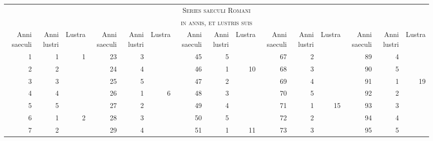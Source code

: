 %
\begin{tabnums} %
\normalsize
\centering
\setlength{\tabcolsep}{2.0pt}
\renewcommand{\arraystretch}{1.0212} %
\newcommand{\hts}{\tiny}
\newcommand{\cwd}{3em}
%
\newcommand{\da}{\scriptsize{†}}
\newcommand{\hdrA}{%
  \hts{\parbox[b]{\cwd}{\raggedright Anni saeculi}} &
  \hts{\parbox[b]{\cwd}{\raggedright Anni lustri}} &
  \hts{\parbox[b]{\cwd}{\raggedright Lustra}}
}
\begin{tabular}{@{} *{15}{r} @{}}
\toprule
\multicolumn{15}{c}{\Large\textsc{Series saeculi Romani}} \\
\multicolumn{15}{c}{\large\textsc{in annis, et lustris suis}} \\
\toprule
 \hdrA & \hdrA & \hdrA & \hdrA & \hdrA
\\
\cmidrule(r){1-3} \cmidrule(r){4-6} \cmidrule(r){7-9}
 \cmidrule(r){10-12} \cmidrule{13-15}
  1 & 1 & 1 & 23 & 3 & ~ & 45 & 5 &  ~ & 67 & 2 & ~ &  89 & 4 &  ~ \\
                           \cline{7-9}
  2 & 2 & ~ & 24 & 4 & ~ & 46 & 1 & 10 & 68 & 3 & ~ &  90 & 5 &  ~ \\
                                                       \cline{13-15}
  3 & 3 & ~ & 25 & 5 & ~ & 47 & 2 &  ~ & 69 & 4 & ~ &  91 & 1 & 19 \\
              \cline{4-6}
  4 & 4 & ~ & 26 & 1 & 6 & 48 & 3 &  ~ & 70 & 5 & ~ &  92 & 2 &  ~ \\
                                         \cline{10-12}
  5 & 5 & ~ & 27 & 2 & ~ & 49 & 4 &  ~ & 71 & 1 & 15 & 93 & 3 &  ~ \\
  \cline{1-3}
  6 & 1 & 2 & 28 & 3 & ~ & 50 & 5 &  ~ & 72 & 2 &  ~ &  94 & 4 &  ~ \\
                           \cline{7-9}
  7 & 2 & ~ & 29 & 4 & ~ & 51 & 1 & 11 & 73 & 3 &  ~ &  95 & 5 &  ~ \\
                                                       \cline{13-15}

\end{tabular}
\end{tabnums}
